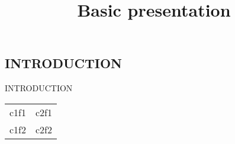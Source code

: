 \documentclass{beamer}
\title{Basic presentation}
\begin{document}
\begin{frame}
\titlepage
\end{frame}
\begin{frame}
\section{INTRODUCTION}
INTRODUCTION
\end{frame}
\begin{frame}
\begin{table}[]
\begin{tabular}{ll}
c1f1 & c2f1 \\ c1f2 & c2f2
\end{tabular}
\end{table}
\end{frame}
\end{document}
